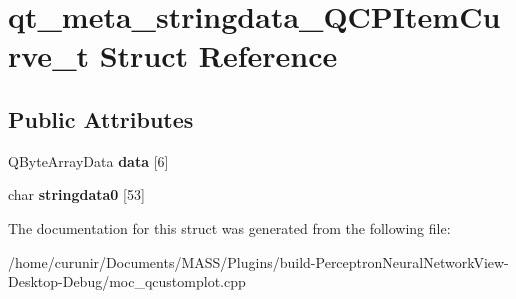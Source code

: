 \hypertarget{structqt__meta__stringdata___q_c_p_item_curve__t}{}\section{qt\+\_\+meta\+\_\+stringdata\+\_\+\+Q\+C\+P\+Item\+Curve\+\_\+t Struct Reference}
\label{structqt__meta__stringdata___q_c_p_item_curve__t}
\subsection*{Public Attributes}
\begin{DoxyCompactItemize}
\item 
Q\+Byte\+Array\+Data {\bfseries data} \mbox{[}6\mbox{]}\hypertarget{structqt__meta__stringdata___q_c_p_item_curve__t_ac6d43f09ee6cd9ad95da06d7fd942e8f}{}\label{structqt__meta__stringdata___q_c_p_item_curve__t_ac6d43f09ee6cd9ad95da06d7fd942e8f}

\item 
char {\bfseries stringdata0} \mbox{[}53\mbox{]}\hypertarget{structqt__meta__stringdata___q_c_p_item_curve__t_a52ddb589fe5c4e7eba75b1eb50799729}{}\label{structqt__meta__stringdata___q_c_p_item_curve__t_a52ddb589fe5c4e7eba75b1eb50799729}

\end{DoxyCompactItemize}


The documentation for this struct was generated from the following file\+:\begin{DoxyCompactItemize}
\item 
/home/curunir/\+Documents/\+M\+A\+S\+S/\+Plugins/build-\/\+Perceptron\+Neural\+Network\+View-\/\+Desktop-\/\+Debug/moc\+\_\+qcustomplot.\+cpp\end{DoxyCompactItemize}
